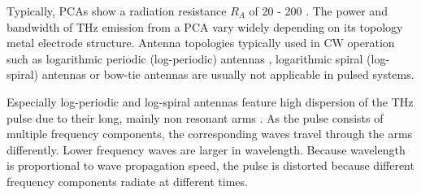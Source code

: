 Typically, PCAs show a radiation resistance $R_A$ of \num{20} - \num{200} \si{\Omega}. The power and bandwidth of THz emission from a PCA vary widely depending on its topology metal electrode structure. Antenna topologies typically used in CW operation such as logarithmic periodic (log-periodic) antennas \cite{mendisTunableCWTHzSystem2004}, logarithmic spiral (log-spiral) \cite{linRoomtemperatureContinuouswaveTerahertz2025} antennas or bow-tie antennas \cite{PDFBowtieWideband} are usually not applicable in pulsed systems. 

Especially log-periodic and log-spiral antennas feature high dispersion of the THz pulse due to their long, mainly non resonant arms \cite{fernandezolveraDispersivePropertiesSelfcomplementary2017a}. As the pulse consists of multiple frequency components, the corresponding waves travel through the arms differently. Lower frequency waves are larger in wavelength. Because wavelength is proportional to wave propagation speed, the pulse is distorted because different frequency components radiate at different times. 

